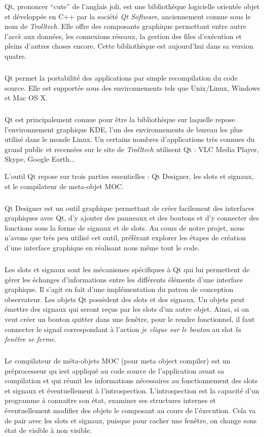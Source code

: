 \par
Qt, prononcer ``cute'' de l'anglais joli, est une biblioth\`eque logicielle orient\'ee objet et d\'evelopp\'ee en C++ par la soci\'et\'e \textit{Qt Software}, anciennement connue sous le nom de \textit{Trolltech}. Elle offre des composants graphique permettant entre autre l'acc\`s aux donn\'ees, les connexions r\'eseaux, la gestion des files d'ex\'ecution et pleins d'autres choses encore. Cette biblioth\`eque est aujourd'hui dans sa version quatre.
\subparagraph{}
Qt permet la portabilit\'e des applications par simple recompilation du code source. Elle est support\'ee sous des environnements tels que Unix/Linux, Windows et Mac OS X.
\subparagraph{}
Qt est principalement connue pour \^etre la biblioth\`eque sur laquelle repose l'environnement graphique KDE, l'un des environnements de bureau les plus utilis\'e dans le monde Linux. Un certains nombres d'applications tr\`es connues du grand public et recens\'ees sur le site de \textit{Trolltech} utilisent Qt : VLC Media Player, Skype, Google Earth...

\par
L'outil Qt repose sur trois parties essentielles : Qt Designer, les slots et signaux, et le compilateur de meta-objet MOC.
\subparagraph{}
Qt Designer est un outil graphique permettant de créer facilement des interfaces graphiques avec Qt, d'y ajouter des panneaux et des boutons et d'y connecter des fonctions sous la forme de signaux et de slots. Au cours de notre projet, nous n'avons que tr\`es peu utilis\'e cet outil, pr\'ef\'erant explorer les \'etapes de cr\'eation d'une interface graphique en r\'ealisant nous m\^eme tout le code.
\subparagraph{}
Les slots et signaux sont les m\'ecanismes sp\'ecifiques \`a Qt qui lui permettent de g\'erer les \'echanges d'informations entre les diff\'erents \'el\'ements d'une interface graphique. Il s'agit en fait d'une impl\'ementation du patron de conception observateur.
Les objets Qt poss\`edent des slots et des signaux. Un objets peut \'emettre des signaux qui seront re\c cus par les slots d'un autre objet. Ainsi, si on veut cr\'eer un bouton quitter dans une fen\^etre, pour le rendre fonctionnel, il faut connecter le signal correspondant à l'action \textit{je clique sur le bouton} au slot \textit{la fen\^etre se ferme}.
\subparagraph{}
Le compilateur de m\'eta-objets MOC (pour meta object compiler) est un pr\'eprocesseur qu iest appliqu\'e au code source de l'application avant sa compilation et qui r\'eunit les informations n\'ecessaires au fonctionnement des slots et signaux et \'eventuellement \`a l'introspection. L'introspection est la capacit\'e d'un programme \`a connaitre son \'etat, examiner ses structures internes et \'eventuellement modifier des objets le composant au cours de l'\'execution. Cela va de pair avec les slots et signaux, puisque pour cacher une fen\^etre, on change sons \'etat de visible \`a non visible.
